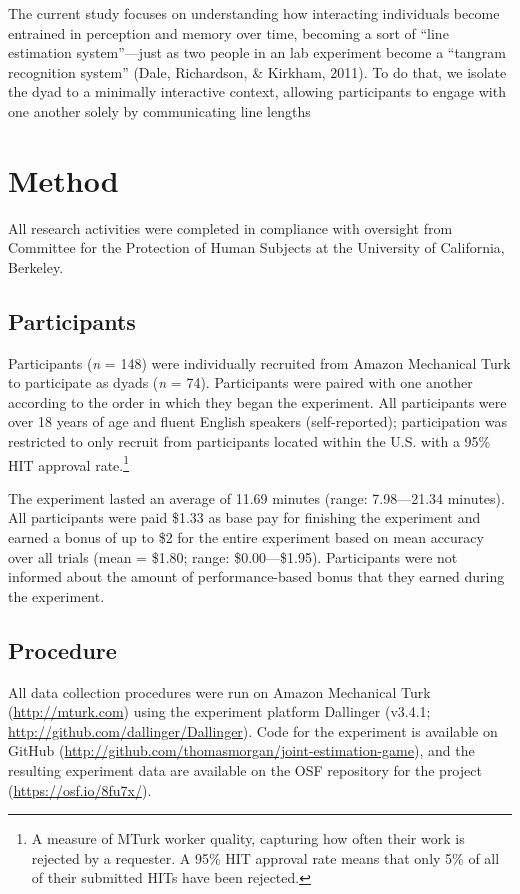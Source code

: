 \documentclass[10pt, letterpaper]{article}
\begin{document}
The current study focuses on understanding how interacting individuals
become entrained in perception and memory over time, becoming a sort of
``line estimation system''---just as two people in an lab experiment
become a ``tangram recognition system'' (Dale, Richardson, \& Kirkham,
2011). To do that, we isolate the dyad to a minimally interactive
context, allowing participants to engage with one another solely by
communicating line lengths

\section{Method}\label{method}

All research activities were completed in compliance with oversight from
Committee for the Protection of Human Subjects at the University of
California, Berkeley.

\subsection{Participants}\label{participants}

Participants (\emph{n} = 148) were individually recruited from Amazon
Mechanical Turk to participate as dyads (\emph{n} = 74). Participants
were paired with one another according to the order in which they began
the experiment. All participants were over 18 years of age and fluent
English speakers (self-reported); participation was restricted to only
recruit from participants located within the U.S. with a 95\% HIT
approval
rate.\footnote{A measure of MTurk worker quality, capturing how often their work is rejected by a requester. A 95\% HIT approval rate means that only 5\% of all of their submitted HITs have been rejected.}

The experiment lasted an average of 11.69 minutes (range: 7.98---21.34
minutes). All participants were paid \$1.33 as base pay for finishing
the experiment and earned a bonus of up to \$2 for the entire experiment
based on mean accuracy over all trials (mean = \$1.80; range:
\$0.00---\$1.95). Participants were not informed about the amount of
performance-based bonus that they earned during the experiment.

\subsection{Procedure}\label{procedure}

All data collection procedures were run on Amazon Mechanical Turk
(\url{http://mturk.com}) using the experiment platform Dallinger
(v3.4.1; \url{http://github.com/dallinger/Dallinger}). Code for the
experiment is available on GitHub
(\url{http://github.com/thomasmorgan/joint-estimation-game}), and the
resulting experiment data are available on the OSF repository for the
project (\url{https://osf.io/8fu7x/}).
\end{document}
